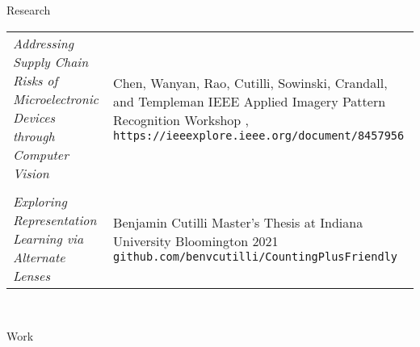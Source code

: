 \begin{LARGE}
Research
\end{LARGE} \vspace{10pt}

\begin{center}

    \begin{tabular}{p{2.0in} p{4.0in}}
       \textit{Addressing Supply Chain Risks
       of Microelectronic Devices
       through Computer Vision}
                                         &
                                            Chen, Wanyan, Rao, Cutilli, Sowinski, Crandall, and
                                            Templeman \newline
                                            IEEE Applied Imagery Pattern Recognition Workshop \newline
                                            2017, \texttt{https://ieeexplore.ieee.org/document/8457956}
                                          \\
    
       \vspace{16pt} \\


       \textit{Exploring Representation
       Learning via Alternate Lenses}
                                         &  
                                            Benjamin Cutilli \newline
                                            Master's Thesis at Indiana University Bloomington
                                            2021 \newline
                                            \texttt{github.com/benvcutilli/CountingPlusFriendly}
                                          \\
    \end{tabular} \\[0.5in]

\end{center}








\begin{LARGE}
Work
\end{LARGE} \vspace{10pt}

